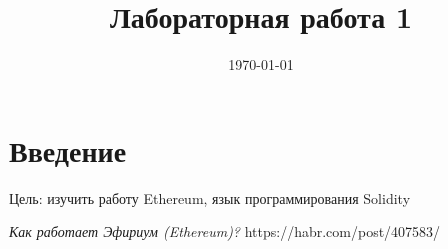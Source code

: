 \documentclass{article}
\begin{document}
\title{Лабораторная работа 1}

\date{\today}
\maketitle


\section{Введение}

Цель: изучить работу Ethereum, язык программирования Solidity





\begin{thebibliography}{9}

	  \emph{Как работает Эфириум (Ethereum)?}
	  https://habr.com/post/407583/

\end{thebibliography}
\end{document}
